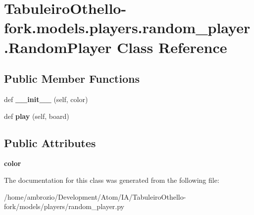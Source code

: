 \hypertarget{class_tabuleiro_othello-fork_1_1models_1_1players_1_1random__player_1_1_random_player}{}\section{Tabuleiro\+Othello-\/fork.models.\+players.\+random\+\_\+player.\+Random\+Player Class Reference}
\label{class_tabuleiro_othello-fork_1_1models_1_1players_1_1random__player_1_1_random_player}
\subsection*{Public Member Functions}
\begin{DoxyCompactItemize}
\item 
\hypertarget{class_tabuleiro_othello-fork_1_1models_1_1players_1_1random__player_1_1_random_player_a459d3baff18a9f4ff4a3d9b7111d9739}{}def {\bfseries \+\_\+\+\_\+init\+\_\+\+\_\+} (self, color)\label{class_tabuleiro_othello-fork_1_1models_1_1players_1_1random__player_1_1_random_player_a459d3baff18a9f4ff4a3d9b7111d9739}

\item 
\hypertarget{class_tabuleiro_othello-fork_1_1models_1_1players_1_1random__player_1_1_random_player_ac87e91e898d8c4d565ddd633b54da1f3}{}def {\bfseries play} (self, board)\label{class_tabuleiro_othello-fork_1_1models_1_1players_1_1random__player_1_1_random_player_ac87e91e898d8c4d565ddd633b54da1f3}

\end{DoxyCompactItemize}
\subsection*{Public Attributes}
\begin{DoxyCompactItemize}
\item 
\hypertarget{class_tabuleiro_othello-fork_1_1models_1_1players_1_1random__player_1_1_random_player_a838e982efda41b04885e21f726f51e89}{}{\bfseries color}\label{class_tabuleiro_othello-fork_1_1models_1_1players_1_1random__player_1_1_random_player_a838e982efda41b04885e21f726f51e89}

\end{DoxyCompactItemize}


The documentation for this class was generated from the following file\+:\begin{DoxyCompactItemize}
\item 
/home/ambrozio/\+Development/\+Atom/\+I\+A/\+Tabuleiro\+Othello-\/fork/models/players/random\+\_\+player.\+py\end{DoxyCompactItemize}
